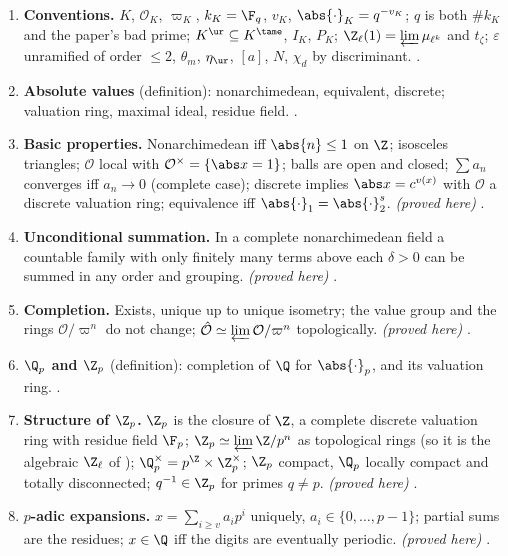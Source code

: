 \begin{enumerate}[label=\textbf{\thechapter.\arabic*}]
\item \textbf{Conventions.} $K$, $\mathcal O_K$, $\varpi_K$, $k_K=\F_q$, $v_K$, $\abs{\cdot}_K=q^{-v_K}$; $q$ is both $\#k_K$ and the paper's bad prime; $K^{\ur}\subseteq K^{\tame}$, $I_K$,
$P_K$; $\Z_\ell(1)=\varprojlim\mu_{\ell^k}$ and $t_\zeta$; $\varepsilon$ unramified of order $\le2$, $\theta_m$, $\eta_{\ur}$, $[a]$, $N$, $\chi_d$ by discriminant.
.
\item \textbf{Absolute values} (definition): nonarchimedean, equivalent, discrete; valuation ring, maximal ideal, residue field. .
\item \textbf{Basic properties.} Nonarchimedean iff $\abs{n}\le1$ on $\Z$; isosceles triangles; $\mathcal O$ local with $\mathcal O^\times=\{\abs x=1\}$; balls are open and
closed; $\sum a_n$ converges iff $a_n\to0$ (complete case); discrete implies $\abs x=c^{v(x)}$ with $\mathcal O$ a discrete valuation ring; equivalence iff
$\abs{\cdot}_1=\abs{\cdot}_2^s$. \emph{(proved here)} .
\item \textbf{Unconditional summation.} In a complete nonarchimedean field a countable family with only finitely many terms above each $\delta>0$ can be summed in any
order and grouping. \emph{(proved here)} .
\item \textbf{Completion.} Exists, unique up to unique isometry; the value group and the rings $\mathcal O/\varpi^n$ do not change; $\hat{\mathcal O}\simeq\varprojlim\mathcal O/\varpi^n$
topologically. \emph{(proved here)} .
\item \textbf{$\Q_p$ and $\Z_p$} (definition): completion of $\Q$ for $\abs{\cdot}_p$, and its valuation ring. .
\item \textbf{Structure of $\Z_p$.} $\Z_p$ is the closure of $\Z$, a complete discrete valuation ring with residue field $\F_p$; $\Z_p\simeq\varprojlim\Z/p^n$ as
topological rings (so it is the algebraic $\Z_\ell$ of ); $\Q_p^\times=p^{\Z}\times\Z_p^\times$; $\Z_p$ compact, $\Q_p$ locally compact and totally
disconnected; $q^{-1}\in\Z_p$ for primes $q\ne p$. \emph{(proved here)} .
\item \textbf{$p$-adic expansions.} $x=\sum_{i\ge v}a_ip^i$ uniquely, $a_i\in\{0,\dots,p-1\}$; partial sums are the residues; $x\in\Q$ iff the digits are eventually
periodic. \emph{(proved here)} .

\end{enumerate}
